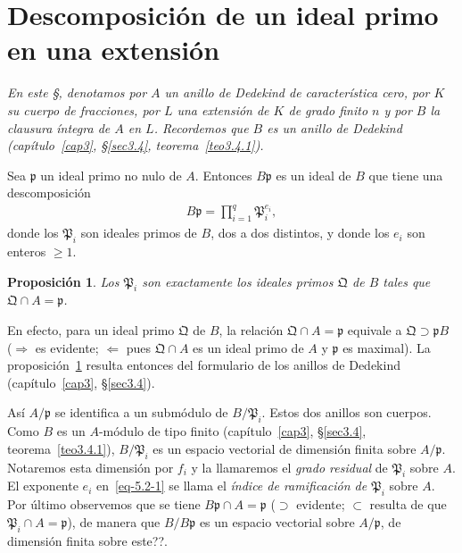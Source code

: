 \documentclass[bibtotoc,leqno,spanish]{amsbook}
\newcommand{\idl}[1]{\mathfrak{#1}}
\numberwithin{equation}{section}
\theoremstyle{note}
\theoremstyle{note}
\newtheorem{proposition}{Proposici\'on}
\theoremstyle{rem}
\numberwithin{theorem}{section}
\numberwithin{proposition}{section}
\numberwithin{definition}{section}
\numberwithin{lemma}{section}
\numberwithin{corollary}{section}
\numberwithin{example}{section}
\numberwithin{footnote}{section}%
\begin{document}
\section{Descomposici\'on de un ideal primo en una extensi\'on}\label{sec5.2}

\begin{trivlist}
\item\textit{En este \S, denotamos por $A$ un anillo de Dedekind de caracter\'istica cero, por $K$ su cuerpo
de fracciones, por $L$ una extensi\'on de $K$ de grado finito $n$ y por $B$ la clausura \'integra de $A$ en $L$.
Recordemos que $B$ es un anillo de Dedekind (cap\'itulo~\ref{cap3}, \S\ref{sec3.4}, teorema~\ref{teo3.4.1}).}
\end{trivlist}

Sea $\idl{p}$ un ideal primo no nulo de $A$. Entonces $B\idl{p}$ es un ideal de $B$ que tiene una descomposici\'on
\begin{gather}\label{eq-5.2-1}
B\idl{p} = \prod_{i=1}^{q}\idl{P}_{i}^{e_{i}},
\end{gather}
donde los $\idl{P}_{i}$ son ideales primos de $B$, dos a dos distintos, y donde los $e_{i}$ son enteros $\geq 1$.

\begin{proposition}\label{prop5.2.1}
Los $\idl{P}_{i}$ son exactamente los ideales primos $\idl{Q}$ de $B$ tales que $\idl{Q}\cap A=\idl{p}$.
\end{proposition}

En efecto, para un ideal primo $\idl{Q}$ de $B$, la relaci\'on $\idl{Q}\cap A=\idl{p}$ equivale a
$\idl{Q}\supset\idl{p}B$ ($\Rightarrow$ es evidente; $\Leftarrow$ pues $\idl{Q}\cap A$ es un ideal primo de
$A$ y $\idl{p}$ es maximal). La proposici\'on~\ref{prop5.2.1} resulta entonces del formulario de los anillos de Dedekind
(cap\'itulo~\ref{cap3}, \S\ref{sec3.4}).

As\'i $A/\idl{p}$ se identifica a un subm\'odulo de $B/\idl{P}_{i}$. Estos dos anillos son cuerpos. Como $B$
es un $A$-m\'odulo de tipo finito (cap\'itulo~\ref{cap3}, \S\ref{sec3.4}, teorema~\ref{teo3.4.1}),
$B/\idl{P}_{i}$ es un espacio vectorial
de dimensi\'on finita sobre $A/\idl{p}$. Notaremos esta dimensi\'on por $f_{i}$ y la llamaremos el
{\em grado residual} de $\idl{P}_{i}$ sobre $A$. El exponente $e_{i}$ en~\eqref{eq-5.2-1} se llama el
{\em \'indice de ramificaci\'on de $\idl{P}_{i}$} sobre $A$. Por \'ultimo observemos que se tiene
$B\idl{p}\cap A = \idl{p}$ ($\supset$ evidente; $\subset$ resulta de que $\idl{P}_{i}\cap A=\idl{p}$), de manera
que $B/B\idl{p}$ es un espacio vectorial sobre $A/\idl{p}$, de dimensi\'on finita sobre este??.
\end{document}
